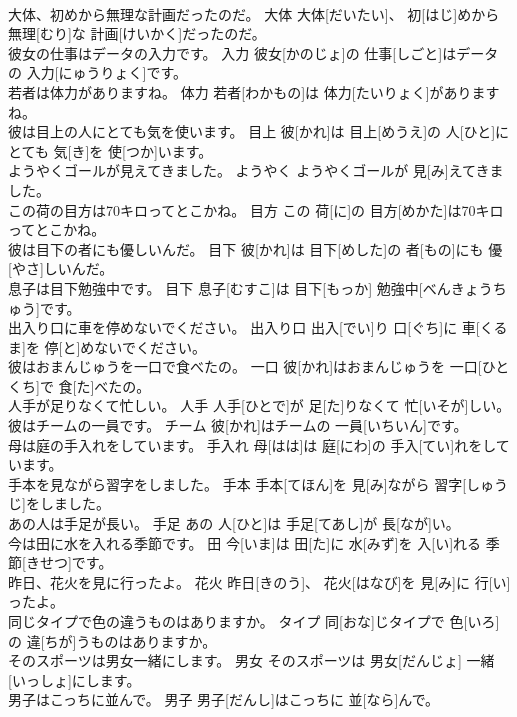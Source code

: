 \documentclass[8pt]{extreport}
\begin{document}
\begin{CJK}{UTF8}{min}
\\	大体、初めから無理な計画だったのだ。	大体	大体[だいたい]、 初[はじ]めから 無理[むり]な 計画[けいかく]だったのだ。	
\\	彼女の仕事はデータの入力です。	入力	彼女[かのじょ]の 仕事[しごと]はデータの 入力[にゅうりょく]です。	
\\	若者は体力がありますね。	体力	若者[わかもの]は 体力[たいりょく]がありますね。	
\\	彼は目上の人にとても気を使います。	目上	彼[かれ]は 目上[めうえ]の 人[ひと]にとても 気[き]を 使[つか]います。	
\\	ようやくゴールが見えてきました。	ようやく	ようやくゴールが 見[み]えてきました。	
\\	この荷の目方は70キロってとこかね。	目方	この 荷[に]の 目方[めかた]は70キロってとこかね。	
\\	彼は目下の者にも優しいんだ。	目下	彼[かれ]は 目下[めした]の 者[もの]にも 優[やさ]しいんだ。	
\\	息子は目下勉強中です。	目下	息子[むすこ]は 目下[もっか] 勉強中[べんきょうちゅう]です。	
\\	出入り口に車を停めないでください。	出入り口	出入[でい]り 口[ぐち]に 車[くるま]を 停[と]めないでください。	
\\	彼はおまんじゅうを一口で食べたの。	一口	彼[かれ]はおまんじゅうを 一口[ひとくち]で 食[た]べたの。	
\\	人手が足りなくて忙しい。	人手	人手[ひとで]が 足[た]りなくて 忙[いそが]しい。	
\\	彼はチームの一員です。	チーム	彼[かれ]はチームの 一員[いちいん]です。	
\\	母は庭の手入れをしています。	手入れ	母[はは]は 庭[にわ]の 手入[てい]れをしています。	
\\	手本を見ながら習字をしました。	手本	手本[てほん]を 見[み]ながら 習字[しゅうじ]をしました。	
\\	あの人は手足が長い。	手足	あの 人[ひと]は 手足[てあし]が 長[なが]い。	
\\	今は田に水を入れる季節です。	田	今[いま]は 田[た]に 水[みず]を 入[い]れる 季節[きせつ]です。	
\\	昨日、花火を見に行ったよ。	花火	昨日[きのう]、 花火[はなび]を 見[み]に 行[い]ったよ。	
\\	同じタイプで色の違うものはありますか。	タイプ	同[おな]じタイプで 色[いろ]の 違[ちが]うものはありますか。	
\\	そのスポーツは男女一緒にします。	男女	そのスポーツは 男女[だんじょ] 一緒[いっしょ]にします。	
\\	男子はこっちに並んで。	男子	男子[だんし]はこっちに 並[なら]んで。	

\end{CJK}
\end{document}
